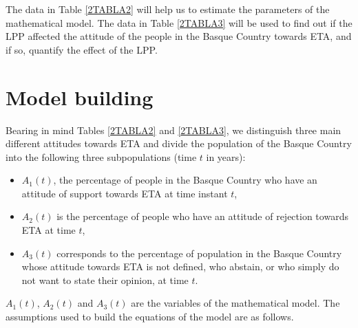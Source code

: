 The data in Table \ref{2TABLA2} will help us to estimate the parameters of the mathematical model. The data in Table \ref{2TABLA3} will be used to find out if the LPP affected the attitude of the people in the Basque Country towards ETA, and if so, quantify the effect of the LPP.

\section{Model building}\label{2.2}  
Bearing in mind Tables \ref{2TABLA2} and \ref{2TABLA3}, we distinguish three main different attitudes towards ETA and divide the population of the Basque Country into the following three subpopulations (time $t$ in years):

\begin{itemize}
\item $A_1(t)$, the percentage of people in the Basque Country who have an attitude of support towards ETA at time instant $t$,
\item $A_2(t)$ is the percentage of people who have an attitude of rejection towards ETA at time $t$, 
\item $A_3(t)$ corresponds to the percentage of population in the Basque Country whose attitude towards ETA is not defined, who abstain, or who simply do not want to state their opinion, at time $t$.
\end{itemize}

$A_1(t)$, $A_2(t)$ and $A_3(t)$ are the variables of the mathematical model. The assumptions used to build the equations of the model are as follows.

